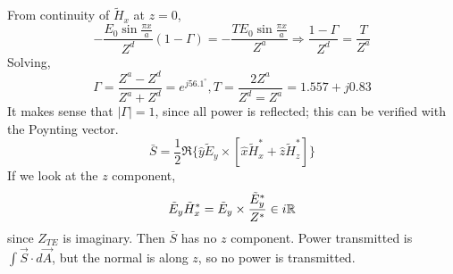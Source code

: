 \documentclass[12pt]{article}
\begin{document}
\begin{ex}
    From continuity of $\tilde H_x$ at $z = 0$,
    $$-\frac{E_0\sin\frac{\pi x}{a}}{Z^d}(1 - \Gamma) = -\frac{TE_0\sin\frac{\pi x}{a}}{Z^a} \Rightarrow \frac{1-\Gamma}{Z^d} = \frac{T}{Z^a}$$
    Solving,
    $$\Gamma = \frac{Z^a - Z^d}{Z^a + Z^d} = e^{j56.1^\circ}, T = \frac{2Z^a}{Z^d = Z^a} = 1.557 + j0.83$$
    It makes sense that $|\Gamma| = 1$, since all power is reflected; this can be verified with the Poynting vector.
    $$\bar S = \frac{1}{2}\Re\{\hat y\tilde E_y \times [\hat x\tilde H_x^* + \hat z\tilde H_z^*]\}$$
    If we look at the $z$ component,
    $$\tilde E_y\tilde H_x^* = \tilde E_y \times \frac{\tilde E_y^*}{Z^*} \in i\mathbb{R}$$
    since $Z_{TE}$ is imaginary. Then $\bar S$ has no $z$ component. Power transmitted is $\int \vec S \cdot d\vec A$, but the normal is along $z$, so no power is transmitted.
\end{ex}
\end{document}

